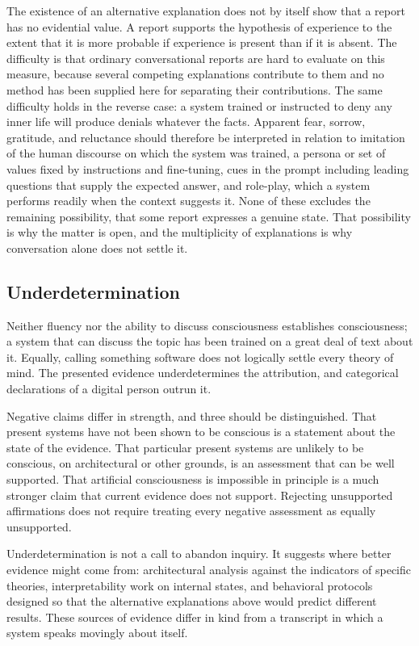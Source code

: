 \documentclass[11pt]{article}
\begin{document}
The existence of an alternative explanation does not by itself show that a report has no evidential value. A report supports the hypothesis of experience to the extent that it is more probable if experience is present than if it is absent. The difficulty is that ordinary conversational reports are hard to evaluate on this measure, because several competing explanations contribute to them and no method has been supplied here for separating their contributions. The same difficulty holds in the reverse case: a system trained or instructed to deny any inner life will produce denials whatever the facts. Apparent fear, sorrow, gratitude, and reluctance should therefore be interpreted in relation to imitation of the human discourse on which the system was trained, a persona or set of values fixed by instructions and fine-tuning, cues in the prompt including leading questions that supply the expected answer, and role-play, which a system performs readily when the context suggests it. None of these excludes the remaining possibility, that some report expresses a genuine state. That possibility is why the matter is open, and the multiplicity of explanations is why conversation alone does not settle it.

\subsection{Underdetermination}

Neither fluency nor the ability to discuss consciousness establishes consciousness; a system that can discuss the topic has been trained on a great deal of text about it. Equally, calling something software does not logically settle every theory of mind. The presented evidence underdetermines the attribution, and categorical declarations of a digital person outrun it.

Negative claims differ in strength, and three should be distinguished. That present systems have not been shown to be conscious is a statement about the state of the evidence. That particular present systems are unlikely to be conscious, on architectural or other grounds, is an assessment that can be well supported. That artificial consciousness is impossible in principle is a much stronger claim that current evidence does not support. Rejecting unsupported affirmations does not require treating every negative assessment as equally unsupported.

Underdetermination is not a call to abandon inquiry. It suggests where better evidence might come from: architectural analysis against the indicators of specific theories, interpretability work on internal states, and behavioral protocols designed so that the alternative explanations above would predict different results. These sources of evidence differ in kind from a transcript in which a system speaks movingly about itself.
\end{document}
